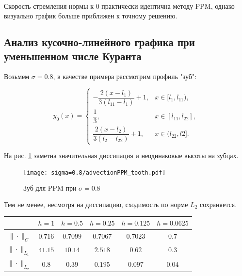 \documentclass[12pt,a4paper]{article}
\newcommand{\picref}[1]{рис. \ref{#1}}
\begin{document}
    Скорость стремления нормы к $ 0 $ практически идентична методу PPM, однако визуально график больше приближен к точному решению.

    \subsection{Анализ кусочно-линейного графика при уменьшенном числе Куранта }

    Возьмем $ \sigma = 0.8 $, в качестве примера рассмотрим профиль "зуб":

    \pagebreak

    \[
        y_0(x) = \begin{cases}
            -\dfrac{2(x-l_1)}{3(l_{11}-l_1)} + 1, & x \in [l_1, l_{11}), \\[0.7em]
               \dfrac{1}{3}, & x \in [l_{11}, l_{22}],
               \\[0.7em]
           \dfrac{2(x-l_{2})}{3(l_2 - l_{22})} + 1, & x \in (l_{22}, l2].
       \end{cases}   
    \]

    На \picref{fig:ppm_tooth_08} заметна значительная диссипация и неодинаковые высоты на зубцах. 

    \begin{figure}[h]
        \centering
        \texttt{[image: sigma=0.8/advectionPPM\_tooth.pdf]}
        \caption{Зуб для PPM при $ \sigma = 0.8 $}
        \label{fig:ppm_tooth_08}
    \end{figure}

    Тем не менее, несмотря на диссипацию, сходимость по норме $ L_2 $ сохраняется.

    \begin{center}
        \begin{tabular}{ |c|c|c|c|c|c| } 
         \hline
         & $ h=1 $ &  $ h=0.5$ &  $ h=0.25 $ &  $ h=0.125 $ &  $ h=0.0625 $ \\ 
         \hline 
         $\| \cdot \|_{C}$ & $0.716$ & $0.7099$ & $0.7067$ & $0.7023$ & $0.7$
         \\
         \hline
         $\| \cdot \|_{L_1}$ & $41.15$ & $10.14$ & $2.518$ & $0.62$ & $0.3$
         \\
         \hline
         $\| \cdot \|_{L_2}$ & $0.8$ & $0.39$ & $0.195$ & $0.097$ & $0.04$
         \\
         \hline
        \end{tabular}
    \end{center}
\end{document}
